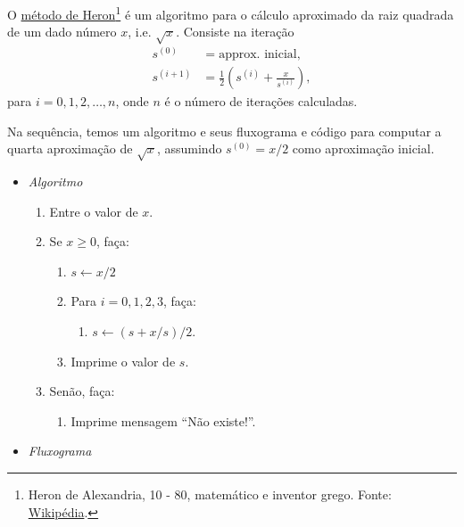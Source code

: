 \begin{ex}\label{cap_lingua_sec_algoprog:ex:metHeron}
  O \href{https://en.wikipedia.org/wiki/Methods_of_computing_square_roots#Heron's_method}{método de Heron}\footnote{Heron de Alexandria, 10 - 80, matemático e inventor grego. Fonte: \href{https://pt.wikipedia.org/wiki/Heron\_de\_Alexandria}{Wikipédia}.} é um algoritmo para o cálculo aproximado da raiz quadrada de um dado número $x$, i.e. $\sqrt{x}$. Consiste na iteração
  \begin{align}
    s^{(0)} &= \text{approx. inicial},\\
    s^{(i+1)} &= \frac{1}{2}\left(s^{(i)} + \frac{x}{s^{(i)}}\right),
  \end{align}
  para $i=0,1,2,\ldots,n$, onde $n$ é o número de iterações calculadas.

  Na sequência, temos um algoritmo e seus fluxograma e código {\python} para computar a quarta aproximação de $\sqrt{x}$, assumindo $s^{(0)} = x/2$ como aproximação inicial.

  \begin{itemize}
  \item \emph{Algoritmo}
    \begin{enumerate}
    \item Entre o valor de $x$.
    \item Se $x\geq 0$, faça:
      \begin{enumerate}
      \item $s \leftarrow x/2$
      \item Para $i = 0,1,2,3$, faça:
        \begin{enumerate}
        \item $s \leftarrow (s + x/s)/2$.
        \end{enumerate}
      \item Imprime o valor de $s$.
      \end{enumerate}
    \item Senão, faça:
      \begin{enumerate}
      \item Imprime mensagem ``Não existe!''.
      \end{enumerate}
    \end{enumerate}

  \item \emph{Fluxograma}


\end{itemize}
\end{ex}
